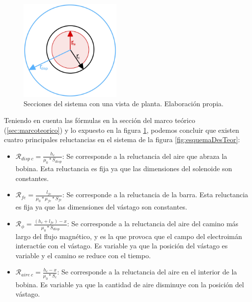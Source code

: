 \begin{figure}[H]
    \centering
    \includegraphics[width=5cm]{FigurasMemoria/areasFlujo.jpg}
    \caption{Secciones del sistema con una vista de planta. Elaboración propia.}
    \label{fig:areasFlujo} %
\end{figure}

Teniendo en cuenta las fórmulas en la sección del marco teórico (\ref{sec:marcoteorico}) y lo expuesto en la figura \ref{fig:areasFlujo}, podemos concluir que existen cuatro principales reluctancias en el sistema de la figura \ref{fig:esquemaDesTeor}:

\begin{itemize}
    \item \(\mathcal{R}_{disp~c}=\frac{h_c}{\mu_0*S_{disp}}\): Se corresponde a la reluctancia del aire que abraza la bobina. Esta reluctancia es fija ya que las dimensiones del solenoide son constantes.
    \item \(\mathcal{R}_{fe}=\frac{l_{fe}}{\mu_0*\mu_{fe}*S_{fe}}\): Se corresponde a la reluctancia de la barra. Esta reluctancia es fija ya que las dimensiones del vástago son constantes.
    \item \(\mathcal{R}_{\phi}=\frac{(h_c+l_{fe})-x}{\mu_0*S_{disp}}\): Se corresponde a la reluctancia del aire del camino más largo del flujo magnético, y es la que provoca que el campo del electroimán interactúe con el vástago. Es variable ya que la posición del vástago es variable y el camino se reduce con el tiempo.
    \item \(\mathcal{R}_{aire~c}=\frac{h_c-x}{\mu_0*S_c}\): Se corresponde a la reluctancia del aire en el interior de la bobina. Es variable ya que la cantidad de aire disminuye con la posición del vástago.
\end{itemize}


